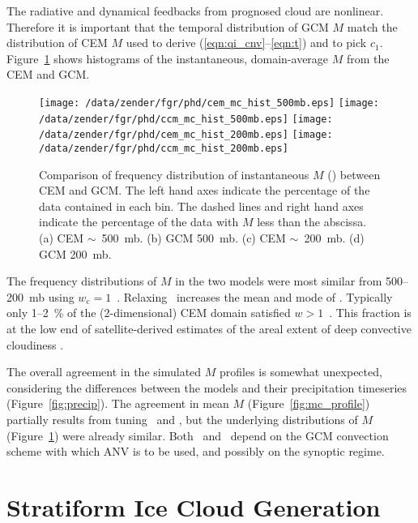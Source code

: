 \documentclass[twoside,agums]{aguplus}
\begin{document}
The radiative and dynamical feedbacks from prognosed cloud are
nonlinear. 
Therefore it is important that the temporal distribution of GCM $M$  
match the distribution of CEM $M$ used to derive
(\ref{eqn:qi_cnv}--\ref{eqn:t}) and to pick $c_1$.  
Figure~\ref{fig:mc_hist} shows histograms of the instantaneous,
domain-average $M$ from the CEM and GCM.
\begin{figure}
\begin{center}
\texttt{[image: /data/zender/fgr/phd/cem\_mc\_hist\_500mb.eps]}\vfill
\texttt{[image: /data/zender/fgr/phd/ccm\_mc\_hist\_500mb.eps]}\vfill
\texttt{[image: /data/zender/fgr/phd/cem\_mc\_hist\_200mb.eps]}\vfill
\texttt{[image: /data/zender/fgr/phd/ccm\_mc\_hist\_200mb.eps]}\vfill
\end{center}
\caption[Comparison of frequency distribution of instantaneous $M$ 
between CEM and GCM]{
Comparison of frequency distribution of instantaneous $M$ (\gxmSs)
between CEM and GCM. 
The left hand axes indicate the percentage of the data contained in
each bin.
The dashed lines and right hand axes indicate the percentage of the
data with $M$ less than the abscissa.
(a) CEM $\sim$~500~mb. (b) GCM 500~mb. (c) CEM $\sim$~200~mb. (d) GCM
200~mb. 
\label{fig:mc_hist}}
\end{figure}
The frequency distributions of $M$ in the two models were most
similar from 500--200~mb using $w_{\mathrm{c}} = 1$~\mxs.
Relaxing \wc\ increases the mean and mode of \Mc.
Typically only 1--2~\% of the (2-dimensional) CEM domain satisfied $w 
> 1$~\mxs.
This fraction is at the low end of satellite-derived estimates
of the areal extent of deep convective cloudiness \cite[]{FDR90}. 

The overall agreement in the simulated $M$ profiles is somewhat
unexpected, considering the differences between the models and their
precipitation timeseries (Figure~\ref{fig:precip}).
The agreement in mean $M$ (Figure~\ref{fig:mc_profile}) partially
results from tuning \qcc\ and \wc, but the underlying distributions of
$M$ (Figure~\ref{fig:mc_hist}) were already similar.
Both \qcc\ and \wc\ depend on the GCM convection scheme
with which ANV is to be used, and possibly on the synoptic regime. 

\section{Stratiform Ice Cloud Generation}\label{sec:srcm}
\end{document}
